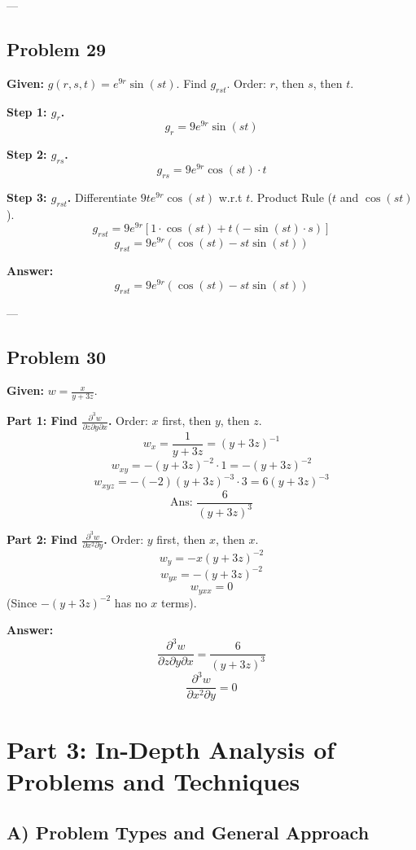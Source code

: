 \documentclass{article}
\begin{document}
---

\subsection*{Problem 29}
\textbf{Given:} $g(r, s, t) = e^{9r} \sin(st)$. Find $g_{rst}$.
Order: $r$, then $s$, then $t$.

\textbf{Step 1: $g_r$.}
\[ g_r = 9e^{9r} \sin(st) \]

\textbf{Step 2: $g_{rs}$.}
\[ g_{rs} = 9e^{9r} \cos(st) \cdot t \]

\textbf{Step 3: $g_{rst}$.}
Differentiate $9t e^{9r} \cos(st)$ w.r.t $t$. Product Rule ($t$ and $\cos(st)$).
\[ g_{rst} = 9e^{9r} [ 1 \cdot \cos(st) + t(-\sin(st) \cdot s) ] \]
\[ g_{rst} = 9e^{9r} (\cos(st) - st \sin(st)) \]

\textbf{Answer:}
\[ g_{rst} = 9e^{9r} (\cos(st) - st \sin(st)) \]

---

\subsection*{Problem 30}
\textbf{Given:} $w = \frac{x}{y + 3z}$.

\textbf{Part 1: Find $\frac{\partial^3 w}{\partial z \partial y \partial x}$.}
Order: $x$ first, then $y$, then $z$.
\[ w_x = \frac{1}{y + 3z} = (y+3z)^{-1} \]
\[ w_{xy} = -(y+3z)^{-2} \cdot 1 = -(y+3z)^{-2} \]
\[ w_{xyz} = -(-2)(y+3z)^{-3} \cdot 3 = 6(y+3z)^{-3} \]
\[ \text{Ans: } \frac{6}{(y+3z)^3} \]

\textbf{Part 2: Find $\frac{\partial^3 w}{\partial x^2 \partial y}$.}
Order: $y$ first, then $x$, then $x$.
\[ w_y = -x(y+3z)^{-2} \]
\[ w_{yx} = -(y+3z)^{-2} \]
\[ w_{yxx} = 0 \]
(Since $-(y+3z)^{-2}$ has no $x$ terms).

\textbf{Answer:}
\[ \frac{\partial^3 w}{\partial z \partial y \partial x} = \frac{6}{(y+3z)^3} \]
\[ \frac{\partial^3 w}{\partial x^2 \partial y} = 0 \]

\newpage

\section{Part 3: In-Depth Analysis of Problems and Techniques}

\subsection{A) Problem Types and General Approach}
\end{document}
